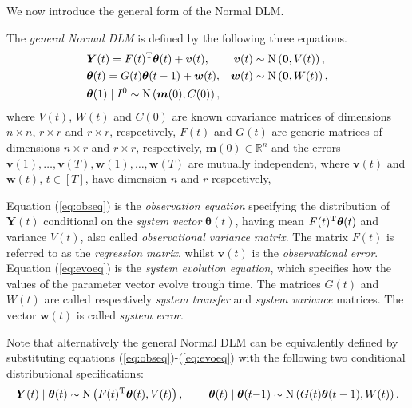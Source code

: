 We now introduce the general form of the Normal DLM. 

\begin{definition}
\label{def:DLM}
The \emph{general Normal DLM} is defined by the following three equations.
\begin{align}
&\bm{Y}(t)=F(t)^{\T}\bm{\theta}(t)+\bm{v}(t),  &\bm{v}(t)&\sim \N\left(\bm{0},V(t)\right),\label{eq:obseq}\\
&\bm{\theta}(t)=G(t)\bm{\theta}(t-1)+\bm{w}(t),  &\bm{w}(t)&\sim \N\left(\bm{0},W(t)\right),\label{eq:evoeq}
\\
&\bm{\theta}(1)\;|\;I^0\sim \N\left(\bm{m}(0),C(0)\right),\nonumber \label{eq:ininfo}
\end{align}
where  $V(t)$, $W(t)$ and $C(0)$ are known covariance matrices of dimensions $n\times n$, $r\times r$ and $r\times r$, respectively, $F(t)$ and $G(t)$ are generic matrices of dimensions $n\times r$ and $r\times r$, respectively, $\bm{m}(0)\in\mathbb{R}^n$ and the errors $\bm{v}(1),\dots,\bm{v}(T), \bm{w}(1),\dots,\bm{w}(T)$ are mutually independent, where $\bm{v}(t)$ and $\bm{w}(t)$, $t\in[T]$, have dimension $n$ and $r$ respectively,  
\end{definition}

Equation (\ref{eq:obseq}) is the \textit{observation equation} specifying the distribution of $\bm{Y}(t)$ conditional on the \textit{system vector} $\bm{\theta}(t)$, having mean $F(t)^{\textnormal{T}}\bm{\theta}(t)$ and variance $V(t)$, also called \textit{observational variance matrix}. The matrix $F(t)$ is referred to as the \textit{regression matrix}, whilst $\bm{v}(t)$ is the \textit{observational error}. Equation (\ref{eq:evoeq}) is the \textit{system evolution equation}, which specifies how the values of the parameter vector evolve trough time. The matrices $G(t)$ and $W(t)$ are called respectively \textit{system transfer} and \textit{system variance} matrices. The vector $\bm{w}(t)$ is called \textit{system error}. 

Note that alternatively the general Normal DLM can be equivalently defined by substituting equations (\ref{eq:obseq})-(\ref{eq:evoeq}) with  the following two conditional distributional specifications:
\begin{equation*}
\label{eq:dlmdefinition}
\bm{Y}(t)\;|\;\bm{\theta}(t)\sim \N\left(F(t)^{\T}\bm{\theta}(t), V(t)\right),\;\;\;\;\;\;\;\; \bm{\theta}(t)\;|\; \bm{\theta}(t{-1}) \sim \N\left(G(t)\bm{\theta}(t-1),W(t)\right).
\end{equation*}

